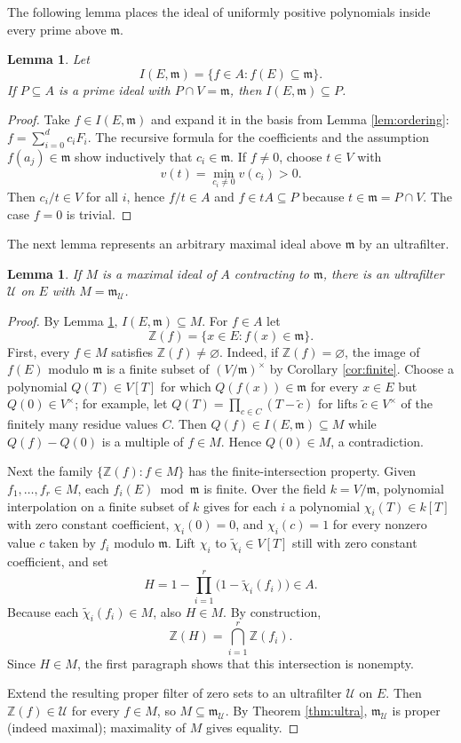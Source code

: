 \documentclass[11pt]{amsart}
\newtheorem{lemma}[theorem]{Lemma}
\theoremstyle{definition}
\theoremstyle{remark}
\newcommand{\Z}{\mathbb{Z}}
\newcommand{\m}{\mathfrak m}
\newcommand{\U}{\mathcal U}
\begin{document}
The following lemma places the ideal of uniformly positive polynomials inside every prime above $\m$.
\begin{lemma}\label{lem:I}
Let
\[
 I(E,\m)=\{f\in A:f(E)\subseteq\m\}.
\]
If $P\subseteq A$ is a prime ideal with $P\cap V=\m$, then $I(E,\m)\subseteq P$.
\end{lemma}
\begin{proof}
Take $f\in I(E,\m)$ and expand it in the basis from Lemma \ref{lem:ordering}:
$f=\sum_{i=0}^d c_iF_i$. The recursive formula for the coefficients and the assumption $f(a_j)\in\m$ show inductively that $c_i\in\m$. If $f\ne0$, choose $t\in V$ with
\[
 v(t)=\min_{c_i\ne0}v(c_i)>0.
\]
Then $c_i/t\in V$ for all $i$, hence $f/t\in A$ and $f\in tA\subseteq P$ because $t\in\m=P\cap V$. The case $f=0$ is trivial.
\end{proof}


The next lemma represents an arbitrary maximal ideal above $\m$ by an ultrafilter.
\begin{lemma}\label{lem:maxultra}
If $M$ is a maximal ideal of $A$ contracting to $\m$, there is an ultrafilter $\U$ on $E$ with $M=\m_{\U}$.
\end{lemma}
\begin{proof}
By Lemma \ref{lem:I}, $I(E,\m)\subseteq M$. For $f\in A$ let
\[
 \Z(f)=\{x\in E:f(x)\in\m\}.
\]
First, every $f\in M$ satisfies $\Z(f)\ne\varnothing$. Indeed, if $\Z(f)=\varnothing$, the image of $f(E)$ modulo $\m$ is a finite subset of $(V/\m)^\times$ by Corollary \ref{cor:finite}. Choose a polynomial $Q(T)\in V[T]$ for which $Q(f(x))\in\m$ for every $x\in E$ but $Q(0)\in V^\times$; for example, let $Q(T)=\prod_{c\in C}(T-\widetilde c)$ for lifts $\widetilde c\in V^\times$ of the finitely many residue values $C$. Then $Q(f)\in I(E,\m)\subseteq M$ while $Q(f)-Q(0)$ is a multiple of $f\in M$. Hence $Q(0)\in M$, a contradiction.

Next the family $\{\Z(f):f\in M\}$ has the finite-intersection property. Given $f_1,\ldots,f_r\in M$, each $f_i(E)\bmod\m$ is finite. Over the field $k=V/\m$, polynomial interpolation on a finite subset of $k$ gives for each $i$ a polynomial $\chi_i(T)\in k[T]$ with zero constant coefficient, $\chi_i(0)=0$, and $\chi_i(c)=1$ for every nonzero value $c$ taken by $f_i$ modulo $\m$. Lift $\chi_i$ to $\widetilde\chi_i\in V[T]$ still with zero constant coefficient, and set
\[
 H=1-\prod_{i=1}^r\bigl(1-\widetilde\chi_i(f_i)\bigr)\in A.
\]
Because each $\widetilde\chi_i(f_i)\in M$, also $H\in M$. By construction,
\[
 \Z(H)=\bigcap_{i=1}^r\Z(f_i).
\]
Since $H\in M$, the first paragraph shows that this intersection is nonempty.

Extend the resulting proper filter of zero sets to an ultrafilter $\U$ on $E$. Then $\Z(f)\in\U$ for every $f\in M$, so $M\subseteq\m_{\U}$. By Theorem \ref{thm:ultra}, $\m_{\U}$ is proper (indeed maximal); maximality of $M$ gives equality.
\end{proof}
\end{document}
